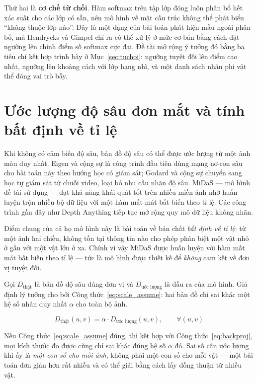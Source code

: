 Thứ hai là \textbf{cơ chế từ chối}. Hàm softmax trên tập lớp đóng luôn phân bổ hết xác suất cho
các lớp có sẵn, nên mô hình về mặt cấu trúc không thể phát biểu ``không thuộc lớp nào''. Đây là
một dạng của bài toán phát hiện mẫu ngoài phân bố, mà Hendrycks và Gimpel
\cite{hendrycks2017baseline} chỉ ra có thể xử lý ở mức cơ bản bằng cách đặt ngưỡng lên chính
điểm số softmax cực đại. Đề tài mở rộng ý tưởng đó bằng ba tiêu chí kết hợp trình bày ở
Mục~\ref{sec:tuchoi}: ngưỡng tuyệt đối lên điểm cao nhất, ngưỡng lên khoảng cách với lớp hạng
nhì, và một danh sách nhãn phi vật thể đóng vai trò bẫy.

\section{Ước lượng độ sâu đơn mắt và tính bất định về tỉ lệ}

Khi không có cảm biến độ sâu, bản đồ độ sâu có thể được ước lượng từ một ảnh màu duy nhất. Eigen
và cộng sự \cite{eigen2014depth} là công trình đầu tiên dùng mạng nơ-ron sâu cho bài toán này
theo hướng học có giám sát; Godard và cộng sự \cite{godard2019monodepth2} chuyển sang học tự
giám sát từ chuỗi video, loại bỏ nhu cầu nhãn độ sâu. MiDaS \cite{ranftl2020midas} --- mô hình
đề tài sử dụng --- đạt khả năng khái quát tốt trên nhiều miền ảnh nhờ huấn luyện trộn nhiều bộ
dữ liệu với một hàm mất mát bất biến theo tỉ lệ. Các công trình gần đây như Depth Anything
\cite{yang2024depthanything} tiếp tục mở rộng quy mô dữ liệu không nhãn.

Điểm chung của cả họ mô hình này là bài toán về bản chất \emph{bất định về tỉ lệ}: từ một ảnh
hai chiều, không tồn tại thông tin nào cho phép phân biệt một vật nhỏ ở gần với một vật lớn ở
xa. Chính vì vậy MiDaS được huấn luyện với hàm mất mát bất biến theo tỉ lệ --- tức là mô hình
được thiết kế để \emph{không} cam kết về đơn vị tuyệt đối.

Gọi $D_{\text{thật}}$ là bản đồ độ sâu đúng đơn vị và $D_{\text{ước lượng}}$ là đầu ra của mô
hình. Giả định lý tưởng cho bởi Công thức~\eqref{eq:scale_assume}: hai bản đồ chỉ sai khác một
hệ số nhân duy nhất $\alpha$ cho toàn bộ ảnh.

\begin{equation}
\label{eq:scale_assume}
D_{\text{thật}}(u,v) = \alpha \cdot D_{\text{ước lượng}}(u,v), \qquad \forall (u,v)
\end{equation}

Nếu Công thức~\eqref{eq:scale_assume} đúng, thì kết hợp với Công thức~\eqref{eq:backproj}, mọi
kích thước đo được cũng chỉ sai khác đúng hệ số $\alpha$ đó. Sai số cần ước lượng khi ấy là
\emph{một con số cho mỗi ảnh}, không phải một con số cho mỗi vật --- một bài toán đơn giản hơn
rất nhiều và có thể giải bằng cách lấy đồng thuận từ nhiều vật.

